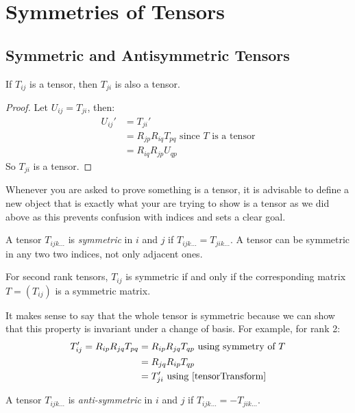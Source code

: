 \documentclass[../main.tex]{subfiles}
\begin{document}
\section{Symmetries of Tensors}
\subsection{Symmetric and Antisymmetric Tensors}
\begin{lemma}
  If $T_{i j}$ is a tensor, then $T_{j i}$ is also a tensor. \label{tensorIndexSwap}
\end{lemma}
\begin{proof}
  Let $U_{ij} = T_{ji}$, then:
  \begin{align*}
    U_{i j}' &= T_{j i}' \\
             &= R_{j p}R_{i q}T_{p q} \text{ since $T$ is a tensor}\\
             &= R_{i q}R_{j p}U_{q p}
  \end{align*}
  So $T_{j i}$ is a tensor.
\end{proof}
\begin{remark}[Advice]
  Whenever you are asked to prove something is a tensor, it is advisable to define a new object that is exactly what your are trying to show is a tensor as we did above as this prevents confusion with indices and sets a clear goal.
\end{remark}
\begin{definition}
  A tensor $T_{ijk\ldots}$ is \textit{symmetric} in $i$ and $j$ if $T_{ijk\ldots} = T_{jik\ldots}$.
  A tensor can be symmetric in any two two indices, not only adjacent ones.
\end{definition}
\begin{remark}
  For second rank tensors, $T_{i j}$ is symmetric if and only if the corresponding matrix $T = (T_{i j})$ is a symmetric matrix.
\end{remark}
It makes sense to say that the whole tensor is symmetric because we can show that this property is invariant under a change of basis.
For example, for rank 2:
\begin{align*}
  T_{i j}' = R_{i p}R_{j q}T_{p q} &= R_{i p}R_{j q}T_{q p} \text{ using symmetry of $T$}\\
                                   &= R_{j q}R_{i p}T_{q p} \\
                                   &= T_{j i}' \text{ using \cref{tensorTransform}}
\end{align*}
\begin{definition}
  A tensor $T_{ijk\ldots}$ is \textit{anti-symmetric} in $i$ and $j$ if $T_{ijk\ldots} = - T_{jik\ldots}$.
\end{definition}
\end{document}
